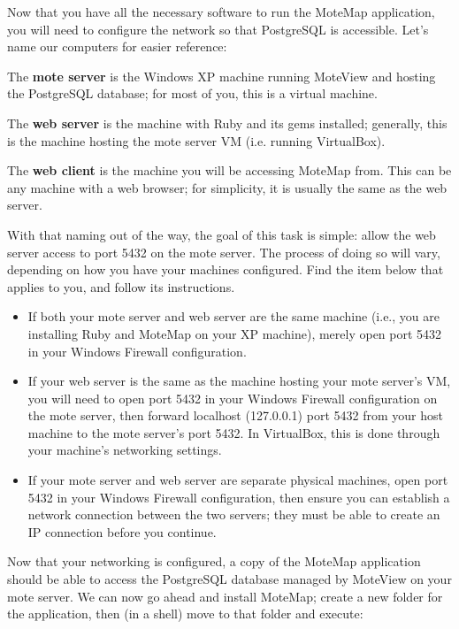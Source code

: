 \documentclass{article}
\begin{document}
Now that you have all the necessary software to run the MoteMap application, you will need to configure the network so that PostgreSQL is accessible. Let's name our computers for easier reference:

\begin{itemize*}
\item The \textbf{mote server} is the Windows XP machine running MoteView and hosting the PostgreSQL database; for most of you, this is a virtual machine.
\item The \textbf{web server} is the machine with Ruby and its gems installed; generally, this is the machine hosting the mote server VM (i.e. running VirtualBox).
\item The \textbf{web client} is the machine you will be accessing MoteMap from. This can be any machine with a web browser; for simplicity, it is usually the same as the web server.
\end{itemize*}

With that naming out of the way, the goal of this task is simple: allow the web server access to port 5432 on the mote server. The process of doing so will vary, depending on how you have your machines configured. Find the item below that applies to you, and follow its instructions.

\begin{itemize}
\item If both your mote server and web server are the same machine (i.e., you are installing Ruby and MoteMap on your XP machine), merely open port 5432 in your Windows Firewall configuration.
\item If your web server is the same as the machine hosting your mote server's VM, you will need to open port 5432 in your Windows Firewall configuration on the mote server, then forward localhost (127.0.0.1) port 5432 from your host machine to the mote server's port 5432. In VirtualBox, this is done through your machine's networking settings.
\item If your mote server and web server are separate physical machines, open port 5432 in your Windows Firewall configuration, then ensure you can establish a network connection between the two servers; they must be able to create an IP connection before you continue.
\end{itemize}


Now that your networking is configured, a copy of the MoteMap application should be able to access the PostgreSQL database managed by MoteView on your mote server. We can now go ahead and install MoteMap; create a new folder for the application, then (in a shell) move to that folder and execute:
\end{document}
